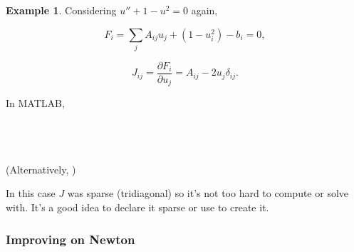 \documentclass[12pt, a4paper]{article}
\theoremstyle{definition}
\newtheorem{example}[thm]{Example}
\theoremstyle{remark}
\numberwithin{equation}{section}
\begin{document}
\begin{example}
Considering $u''+1-u^2=0$ again, 

\begin{equation*}
F_i=\sum_j {A}_{ij}u_j +  (1-u_i^2)-{b}_i=0,
\end{equation*}

\begin{equation*}
J_{ij} = \frac{\partial F_i}{\partial u_j} = {A}_{ij} - 2u_j\delta_{ij}.
\end{equation*}

In MATLAB,

\\
\\
\\
  (Alternatively, )

\end{example}

In this case $J$ was sparse (tridiagonal) so it's not too hard to compute or solve with.  It's a good idea to declare it sparse or use  to create it.

\newpage
\subsubsection{Improving on Newton}
\end{document}
